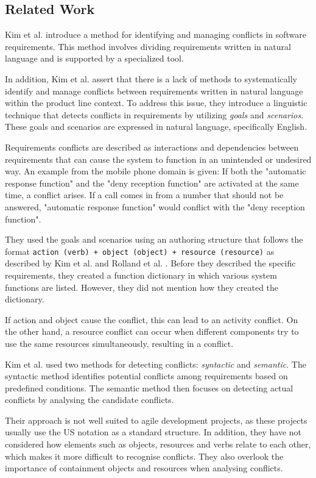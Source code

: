 \subsection{Related Work}\label{conflict_related_work}
Kim et al. introduce a method for identifying and managing conflicts in software requirements. This method involves dividing requirements written in natural language and is supported by a specialized tool\cite{kim2007managing}.

In addition, Kim et al. assert that there is a lack of methods to systematically identify and manage conflicts between requirements written in natural language within the product line context. To address this issue, they introduce a linguistic technique that detects conflicts in requirements by utilizing \textit{goals} and \textit{scenarios}. These goals and scenarios are expressed in natural language, specifically English.

Requirements conflicts are described as interactions and dependencies between requirements that can cause the system to function in an unintended or undesired way. An example from the mobile phone domain is given: If both the "automatic response function" and the "deny reception function" are activated at the same time, a conflict arises. If a call comes in from a number that should not be answered, "automatic response function" would conflict with the "deny reception function".

They used the goals and scenarios using an authoring structure that follows the format \texttt{action (verb) + object (object) + resource (resource)} as described by Kim et al. \cite{kim2004method,kim2004multi} and Rolland et al. \cite{rolland1998guiding}. Before they described the specific requirements, they created a function dictionary in which various system functions are listed. However, they did not mention how they created the dictionary.

If action and object cause the conflict, this can lead to an activity conflict. On the other hand, a resource conflict can occur when different components try to use the same resources simultaneously, resulting in a conflict.

Kim et al. used two methods for detecting conflicts: \textit{syntactic} and \textit{semantic}. The syntactic method identifies potential conflicts among requirements based on predefined conditions. The semantic method then focuses on detecting actual conflicts by analysing the candidate conflicts.

Their approach is not well suited to agile development projects, as these projects usually use the US notation as a standard structure. In addition, they have not considered how elements such as objects, resources and verbs relate to each other, which makes it more difficult to recognise conflicts. They also overlook the importance of containment objects and resources when analysing conflicts.

